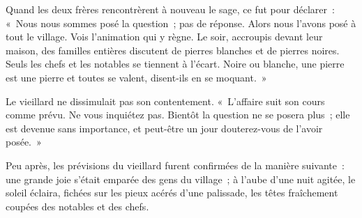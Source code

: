 \documentclass[french,twoside]{book} %
\begin{document}
Quand les deux frères rencontrèrent à nouveau le sage, ce fut pour déclarer : « Nous nous sommes posé la question ; pas de réponse. Alors nous l’avons posé à tout le village. Vois l’animation qui y règne. Le soir, accroupis devant leur maison, des familles entières discutent de pierres blanches et de pierres noires. Seuls les chefs et les notables se tiennent à l’écart. Noire ou blanche, une pierre est une pierre et toutes se valent, disent-ils en se moquant. »\par
Le vieillard ne dissimulait pas son contentement. « L’affaire suit son cours comme prévu. Ne vous inquiétez pas. Bientôt la question ne se posera plus ; elle est devenue sans importance, et peut-être un jour douterez-vous de l’avoir posée. »\par
Peu après, les prévisions du vieillard furent confirmées de la manière suivante : une grande joie s’était emparée des gens du village ; à l’aube d’une nuit agitée, le soleil éclaira, fichées sur les pieux acérés d’une palissade, les têtes fraîchement coupées des notables et des chefs.
\end{document}
